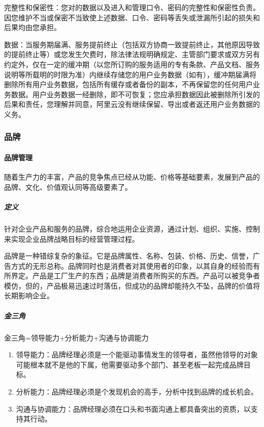 \documentclass[letterpaper,11pt,english]{sphinxmanual}
\begin{document}
完整性和保密性：您对的数据以及进入和管理口令、密码的完整性和保密性负责。因您维护不当或保密不当致使上述数据、口令、密码等丢失或泄漏所引起的损失和后果均由您承担。

数据：当服务期届满、服务提前终止（包括双方协商一致提前终止，其他原因导致的提前终止等）或您发生欠费时，除法律法规明确规定、主管部门要求或双方另有约定外，仅在一定的缓冲期（以您所订购的服务适用的专有条款、产品文档、服务说明等所载明的时限为准）内继续存储您的用户业务数据（如有），缓冲期届满将删除所有用户业务数据，包括所有缓存或者备份的副本，不再保留您的任何用户业务数据。用户业务数据一经删除，即不可恢复；您应承担数据因此被删除所引发的后果和责任，您理解并同意，阿里云没有继续保留、导出或者返还用户业务数据的义务。


\subsubsection{品牌}
\label{\detokenize{chapter_idea/brand:id1}}\label{\detokenize{chapter_idea/brand::doc}}

\paragraph{品牌管理}
\label{\detokenize{chapter_idea/brand:id2}}
随着生产力的丰富，产品的竞争焦点已经从功能、价格等基础要素，发展到产品的品牌、文化、价值观认同等高级要素了。


\subparagraph{定义}
\label{\detokenize{chapter_idea/brand:id3}}
针对企业产品和服务的品牌，综合地运用企业资源，通过计划、组织、实施、控制来实现企业品牌战略目标的经营管理过程。

品牌是一种错综复杂的象征。它是品牌属性、名称、包装、价格、历史、信誉，广告方式的无形总称。品牌同时也是消费者对其使用者的印象，以其自身的经验而有所界定。产品是工厂生产的东西；品牌是消费者所购买的东西。产品可以被竞争者模仿，但的，产品极易迅速过时落伍，但成功的品牌却能持久不坠，品牌的价值将长期影响企业。


\subparagraph{金三角}
\label{\detokenize{chapter_idea/brand:id4}}
金三角=领导能力+分析能力+沟通与协调能力
\begin{enumerate}
%
\item {} 
领导能力：品牌经理必须是一个能驱动事情发生的领导者，虽然他领导的对象可能根本就不是他的下属，他需要驱动多个部门、甚至老板一起完成品牌目标。

\item {} 
分析能力：品牌经理必须是个发现机会的高手，分析中找到品牌的成长机会。

\item {} 
沟通与协调能力：品牌经理必须在口头和书面沟通上都具备突出的资质，以支持其行动。

\end{enumerate}
\end{document}
